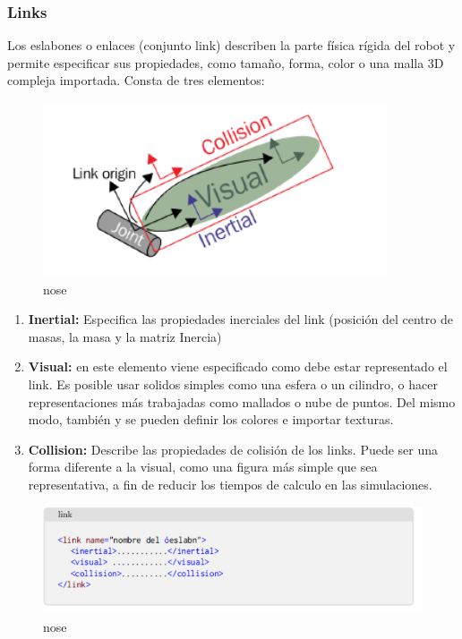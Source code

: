         \subsubsection{Links}
        
        Los eslabones o enlaces (conjunto link) describen la parte física rígida del robot y permite especificar sus propiedades, como tamaño, forma, color o una malla 3D compleja importada. Consta de tres elementos:
    
        \begin{figure}[htb]
            \centering
            \includegraphics[width=0.5\linewidth]{Main/Chapter3/Images3/3-7/eslabon2.png}
            \caption{nose}
            \label{f:Cap3-7_noseee_urdf}
        \end{figure} 

        \begin{enumerate}
            \item \textbf{Inertial:} Especifica las propiedades inerciales del link (posición del centro de masas, la masa y la matriz Inercia)
            \item \textbf{Visual:} en este elemento viene especificado como debe estar representado el link. Es posible usar solidos simples como una esfera o un cilindro, o hacer representaciones más trabajadas como mallados o nube de puntos. Del mismo modo, también y se pueden definir los colores e importar texturas.
            \item \textbf{Collision:} Describe las propiedades de colisión de los links. Puede ser una forma diferente a la visual, como una figura más simple que sea representativa, a fin de reducir los tiempos de calculo en las simulaciones.
        \end{enumerate}
        
        \begin{figure}[htb]
            \centering
            \includegraphics[width=0.8\linewidth]{Main/Chapter3/Images3/3-7/codigo.png}
            \caption{nose}
            \label{f:Cap3-7_nose_nose}
        \end{figure} 
        
